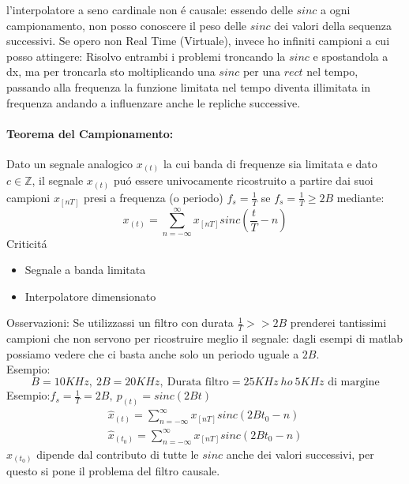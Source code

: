             l'interpolatore a seno cardinale non é causale: essendo delle $sinc$ a ogni campionamento, non posso conoscere il peso delle $sinc$ 
            dei valori della sequenza successivi. Se opero non Real Time (Virtuale), invece ho infiniti campioni a cui posso attingere: Risolvo entrambi i 
            problemi troncando la $sinc$ e spostandola a dx, ma per troncarla sto moltiplicando una $sinc$ per una $rect$ nel tempo, passando alla frequenza 
            la funzione limitata nel tempo diventa illimitata in frequenza andando a influenzare anche le repliche successive.


        
        \paragraph{Teorema del Campionamento:} Dato un segnale analogico $x_{(t)}$ la cui banda di frequenze sia limitata e dato $c\in \mathbb{Z}$,
        il segnale $x_{(t)}$ puó essere univocamente ricostruito a partire dai suoi campioni $x_{[nT]}$ presi a frequenza (o periodo) $f_s = \frac{1}{T}$ se 
        $f_s = \frac{1}{T} \geq 2B$ mediante:
        \[
            x_{(t)} = \sum_{n=-\infty}^{\infty} x_{[nT]}sinc\left(\frac{t}{T}-n\right) 
        \]
        Criticitá
        \begin{itemize}
            \item {Segnale a banda limitata}
            \item {Interpolatore dimensionato}
        \end{itemize}
        Osservazioni: Se utilizzassi un filtro con durata $\frac{1}{T}>>2B$ prenderei tantissimi campioni che
        non servono per ricostruire meglio il segnale: dagli esempi di matlab possiamo vedere che ci basta anche solo un periodo uguale a $2B$.\\
        Esempio:
        \[
            B = 10KHz,\ 2B = 20KHz,\ \text{Durata filtro} = 25KHz\ ho\ 5KHz\text{ di margine}
        \]
        Esempio:$f_s = \frac{1}{T} = 2B,\ p_{(t)}=sinc(2Bt)$
        \begin{gather}
                \hat{x}_{(t)} = \sum_{n=-\infty}^{\infty} x_{[nT]}sinc\left(2Bt_0 -n\right) \nonumber \\
                \hat{x}_{(t_0)} = \sum_{n=-\infty}^{\infty} x_{[nT]}sinc\left(2Bt_0 -n\right) \nonumber
        \end{gather}
        $\hat{x}_{(t_0)}$ dipende dal contributo di tutte le $sinc$ anche dei valori successivi, per questo si pone il problema del filtro causale. 
